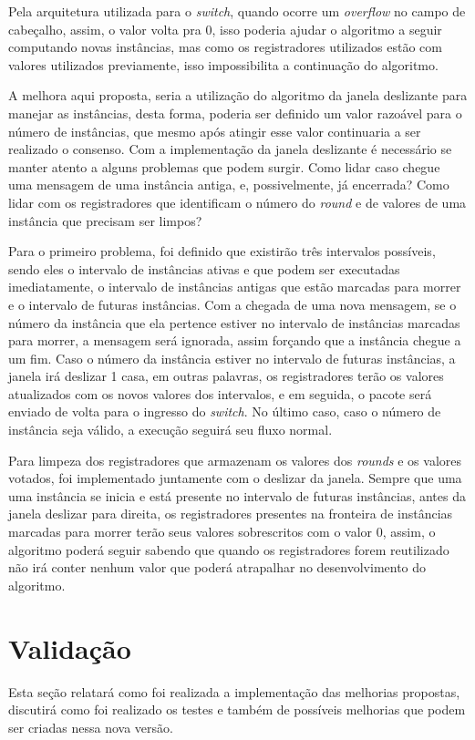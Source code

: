 \documentclass[
    12pt,
    openright, 
    oneside,
    a4paper,
    french,
    english,
    brazil
    ]{facom-ufu-abntex2}
\theoremstyle{definition}
\begin{document}
Pela arquitetura utilizada para o \emph{switch}, quando ocorre um \emph{overflow} no campo de cabeçalho, assim,
o valor volta pra 0, isso poderia ajudar o algoritmo a seguir computando novas instâncias, mas como
os registradores utilizados estão com valores utilizados previamente, isso impossibilita a continuação
do algoritmo.

A melhora aqui proposta, seria a utilização do algoritmo da janela deslizante para manejar as instâncias,
desta forma, poderia ser definido um valor razoável para o número de instâncias, que mesmo após atingir
esse valor continuaria a ser realizado o consenso. Com a implementação da janela deslizante é necessário
se manter atento a alguns problemas que podem surgir. Como lidar caso chegue uma mensagem
de uma instância antiga, e, possivelmente, já encerrada? Como lidar com os registradores que identificam
o número do \emph{round} e de valores de uma instância que precisam ser limpos?

Para o primeiro problema, foi definido que existirão três intervalos possíveis, sendo eles o intervalo
de instâncias ativas e que podem ser executadas imediatamente, o intervalo de instâncias antigas que
estão marcadas para morrer e o intervalo de futuras instâncias. Com a chegada de uma nova mensagem, se o 
número da instância que ela pertence estiver no intervalo de instâncias marcadas para morrer, a mensagem
será ignorada, assim forçando que a instância chegue a um fim. Caso o número da instância estiver no
intervalo de futuras instâncias, a janela irá deslizar 1 casa, em outras palavras, os registradores terão
os valores atualizados com os novos valores dos intervalos, e em seguida, o pacote será enviado de volta 
para o ingresso do \emph{switch}. No último caso, caso o número de instância seja válido,
a execução seguirá seu fluxo normal.

Para limpeza dos registradores que armazenam os valores dos \emph{rounds} e os valores votados, foi implementado
juntamente com o deslizar da janela. Sempre que uma uma instância se inicia e está presente no intervalo de
futuras instâncias, antes da janela deslizar para direita, os registradores presentes na fronteira de 
instâncias marcadas para morrer terão seus valores sobrescritos com o valor 0, assim, o algoritmo poderá
seguir sabendo que quando os registradores forem reutilizado não irá conter nenhum valor que poderá atrapalhar
no desenvolvimento do algoritmo.

\section{Validação}
Esta seção relatará como foi realizada a implementação das melhorias propostas, discutirá como foi realizado
os testes e também de possíveis melhorias que podem ser criadas nessa nova versão.
\end{document}

